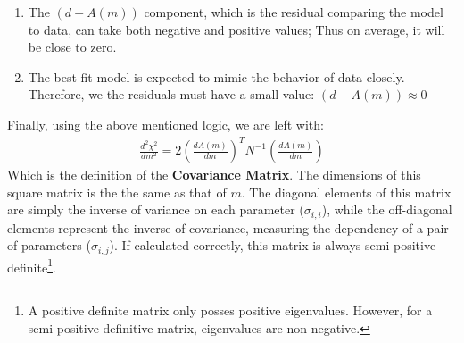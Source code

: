 \documentclass[12pt, TexShade, letterpaper]{report}
\begin{document}
\begin{enumerate}
    \item The $(d - A(m))$ component, which is the residual comparing the model to data, can take both negative and positive values; Thus on average, it will be close to zero.
    \item The best-fit model is expected to mimic the behavior of data closely. Therefore, we the residuals must have a small value: $(d - A(m)) \approx 0$
\end{enumerate}
Finally, using the above mentioned logic, we are left with:
\begin{align}
         \frac{d^2 \chi^2}{dm^2} = 2 (\frac{dA(m)}{dm})^T N^{-1} (\frac{dA(m)}{dm}) \label{eq:csq_second_deriv}
\end{align}
Which is the definition of the \textbf{Covariance Matrix}. The dimensions of this square matrix is the the same as that of $m$. The diagonal elements of this matrix are simply the inverse of variance on each parameter ($\sigma_{i, i}$), while the off-diagonal elements represent the inverse of covariance, measuring the dependency of a pair of parameters ($\sigma_{i, j}$). If calculated correctly, this matrix is always semi-positive definite\footnote{A positive definite matrix only posses positive eigenvalues. However, for a semi-positive definitive matrix, eigenvalues are non-negative.}.\par
\end{document}
